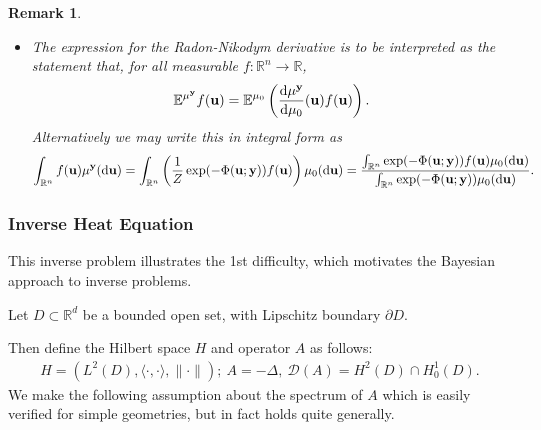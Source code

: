 \documentclass[oneside]{article}
\numberwithin{equation}{section}
\newtheorem{remark}{Remark}[section]
\begin{document}
\begin{remark}
\begin{itemize}
        This is rewriting Bayes' formula in the form
        \begin{align*}
            \frac{1}{\mathbb{P}({\bf u})}\mathbb{P}({\bf u}|{\bf y}) = \frac{1}{\mathbb{P}({\bf y})}\mathbb{P}({\bf y}|{\bf u}).
        \end{align*}
        \item The expression for the Radon-Nikodym derivative is to be interpreted as the statement that, for all measurable $f:\mathbb{R}^n\to\mathbb{R}$,
        \begin{align*}
            \mathbb{E}^{\mu^{\bf y}}f({\bf u}) = \mathbb{E}^{\mu_0}\left(\frac{{\rm d}\mu^{\bf y}}{{\rm d}\mu_0}({\bf u})f({\bf u})\right).
        \end{align*}
        Alternatively we may write this in integral form as
        \begin{align*}
            \int_{\mathbb{R}^n} f({\bf u})\mu^{\bf y}({\rm d}{\bf u}) = \int_{\mathbb{R}^n} \left(\frac{1}{Z}\exp(-\Phi({\bf u};{\bf y}))f({\bf u})\right)\mu_0({\rm d}{\bf u}) = \frac{\int_{\mathbb{R}^n} \exp(-\Phi({\bf u};{\bf y}))f({\bf u})\mu_0({\rm d}{\bf u})}{\int_{\mathbb{R}^n} \exp(-\Phi({\bf u};{\bf y}))\mu_0({\rm d}{\bf u})}.
        \end{align*}
    \end{itemize}
\end{remark}

\subsubsection{Inverse Heat Equation}
This inverse problem illustrates the 1st difficulty, which motivates the Bayesian approach to inverse problems.

Let $D\subset\mathbb{R}^d$ be a bounded open set, with Lipschitz boundary $\partial D$.

Then define the Hilbert space $H$ and operator $A$ as follows:
\begin{align*}
    H = (L^2(D),\langle\cdot,\cdot\rangle,\|\cdot\|);\ A = -\Delta,\ \mathcal{D}(A) = H^2(D)\cap H_0^1(D).
\end{align*}
We make the following assumption about the spectrum of $A$ which is easily verified for simple geometries, but in fact holds quite generally.
\end{document}
